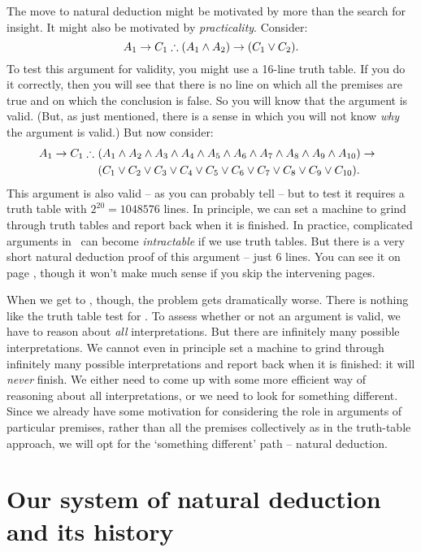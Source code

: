 
The move to natural deduction might be motivated by more than the search for insight. It might also be motivated by \emph{practicality}. Consider:
	$$A_1 \rightarrow C_1 \mathrel{\therefore} (A_1 \wedge A_2) \rightarrow (C_1 \vee C_2).$$
To test this argument for validity, you might use a 16-line truth table. If you do it correctly, then you will see that there is no line on which all the premises are true and on which the conclusion is false. So you will know that the argument is valid. (But, as just mentioned, there is a sense in which you will not know \emph{why} the argument is valid.) But now consider:\label{longtt}
	\begin{align*}
		A_1 \rightarrow C_1 \mathrel{\therefore}\ & (A_1 \wedge A_2 \wedge A_3 \wedge A_4 \wedge A_5 \wedge A_6 \wedge A_7 \wedge A_8 \wedge A_9 \wedge A_{10}) \rightarrow \phantom{(}\\
				&(C_1 \vee C_2 \vee C_3 \vee C_4 \vee C_5 \vee C_6 \vee C_7 \vee C_8 \vee C_9 \vee C_{10}).
	\end{align*}
This argument is also valid – as you can probably tell – but to test it requires a truth table with $2^{20} = 1048576$ lines. In principle, we can set a machine to grind through truth tables and report back when it is finished. In practice, complicated arguments in \TFL\ can become \emph{intractable} if we use truth tables. But there is a very short natural deduction proof of this argument – just 6 lines. You can see it on page \pageref{ndshort}, though it won't make much sense if you skip the intervening pages.

When we get to \FOL, though, the problem gets dramatically worse. There is nothing like the truth table test for \FOL. To assess whether or not an argument is valid, we have to reason about \emph{all} interpretations. But there are infinitely many possible interpretations. We cannot even in principle set a machine to grind through infinitely many possible interpretations and report back when it is finished: it will \emph{never} finish. We either need to come up with some more efficient way of reasoning about all interpretations, or we need to look for something different. Since we already have some motivation for considering the role in arguments of particular premises, rather than all the premises collectively as in the truth-table approach, we will opt for the `something different' path – natural deduction.

\section{Our system of natural deduction and its history} %
\label{sec:our_system_of_natural_deduction_and_its_history}

